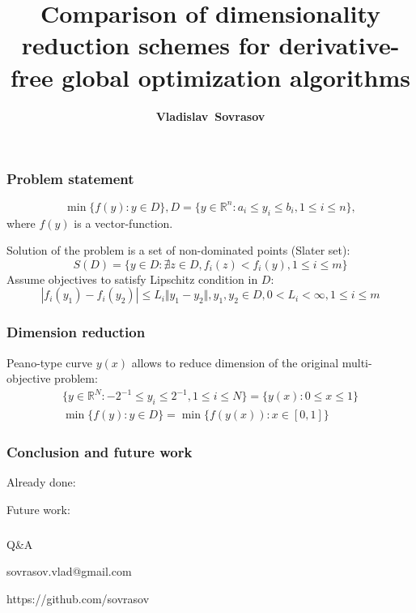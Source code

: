 \documentclass[aspectratio=1610]{beamer}
\title{Comparison of dimensionality reduction schemes for derivative-free global optimization algorithms}
\author{\textbf{Vladislav~Sovrasov}}
\institute{Lobachevsky State University of Nizhni Novgorod}
\date{}
\begin{document}
\begin{frame}
\titlepage
\end{frame}

\begin{frame}
  \begin{center}
  \frametitle{Problem statement}

  \begin{displaymath}
    \min\{f(y): y\in D\}, D=\{y\in \mathbb{R}^n: a_i \leqslant y_i \leqslant b_i, 1\leqslant i \leqslant n \},
  \end{displaymath}
where \(f(y)\) is a vector-function.

\enspace
Solution of the problem is a set of non-dominated points (Slater set):
  \begin{displaymath}
    S(D) = \{y\in D: \nexists z\in D, f_i(z)<f_i(y),1\leqslant i \leqslant m\}
  \end{displaymath}
Assume objectives to satisfy Lipschitz condition in \(D\):
  \begin{displaymath}
    |f_i(y_1)-f_i(y_2)|\leqslant L_i\Vert y_1-y_2\Vert,y_1,y_2\in D,0<L_i<\infty,1\leqslant i\leqslant m
  \end{displaymath}

\end{center}
\end{frame}

\begin{frame}
  \frametitle{Dimension reduction}
  Peano-type curve \(y(x)\) allows to reduce dimension of the original multi-objective problem:
  \begin{gather}
    \lbrace y\in \mathbb{R}^N:-2^{-1}\leqslant y_i\leqslant 2^{-1},1\leqslant i\leqslant N\rbrace=\{y(x):0\leqslant x\leqslant 1\} \nonumber \\
    \min\{f(y): y\in D\}=\min\{f(y(x)): x\in [0,1]\} \nonumber
  \end{gather}

\end{frame}

\begin{frame}
  \frametitle{Conclusion and future work}
    Already done:
    \begin{itemize}
    \end{itemize}
    Future work:
    \begin{itemize}
    \end{itemize}
\end{frame}

\begin{frame}{{}}
  \frametitle{ }
  \begin{center}
    \Large{Q\&A}

\vspace{1cm}

    sovrasov.vlad@gmail.com

    https://github.com/sovrasov
  \end{center}
\end{frame}
\end{document}
